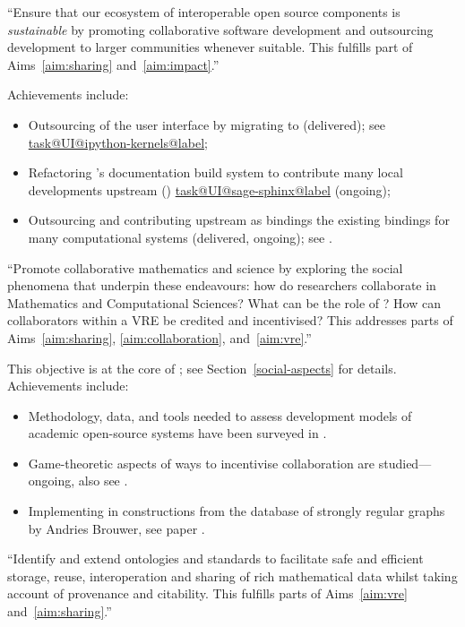 \documentclass{deliverablereport}
\makeatletter
\newcommand\localtaskref[2]{\hyperref[#1@#2]{\csname task@#1@#2@label\endcsname}}
\makeatother
\begin{document}
\begin{compactenum}
\item \label{objective:sustainable} ``Ensure that our ecosystem of
  interoperable open source components is \emph{sustainable} by
  promoting collaborative software development and outsourcing
  development to larger communities whenever suitable. This fulfills
  part of Aims~\ref{aim:sharing} and~\ref{aim:impact}.''

  Achievements include:
  \begin{itemize}
  \item Outsourcing of the \Sage user interface by migrating to
    \Jupyter (delivered); see \localtaskref{UI}{ipython-kernels};
  \item Refactoring \Sage's documentation build system to contribute
    many local developments upstream (\Sphinx)
    \localtaskref{UI}{sage-sphinx} (ongoing);
  \item Outsourcing and contributing upstream as \Python bindings the
    existing \Sage bindings for many computational systems (delivered,
    ongoing); see .
  \end{itemize}

\item \label{objective:social} ``Promote collaborative mathematics and
  science by exploring the social phenomena that underpin these
  endeavours: how do researchers collaborate in Mathematics and
  Computational Sciences?  What can be the role of \VREs?  How can
  collaborators within a VRE be credited and incentivised? This
  addresses parts of Aims~\ref{aim:sharing}, \ref{aim:collaboration},
  and~\ref{aim:vre}.''

  This objective is at the core of ; see
  Section~\ref{social-aspects} for details.
  Achievements include:
  \begin{itemize}
  \item Methodology, data, and tools needed to assess
    development models of academic open-source systems have been surveyed in
    .
  \item Game-theoretic aspects of ways to incentivise
  collaboration are studied---ongoing, also see \cite{Pavlou:2016:MCI:2936924.2936934}.
  \item Implementing in \Sage constructions from the database of
  strongly regular graphs by Andries Brouwer, see paper \cite{2016arXiv160100181C}.
  \end{itemize}


\item \label{objective:data} ``Identify and extend ontologies and
  standards to facilitate safe and efficient storage, reuse,
  interoperation and sharing of rich mathematical data whilst taking
  account of provenance and citability. This fulfills parts of
  Aims~\ref{aim:vre} and~\ref{aim:sharing}.''


\end{compactenum}
\end{document}
